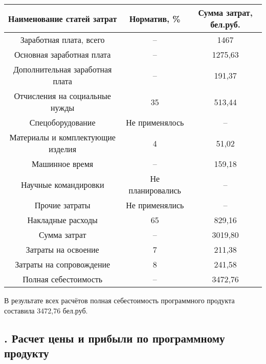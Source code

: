 {{\begin{Center}
	\begin{tabular}{|c|c|c|}
		\hline
		Наименование статей затрат & Норматив, \% & Сумма затрат, бел.руб. \\ \hline
		Заработная плата, всего & {--} & 1467 \\ \hline
		Основная заработная плата & {--} & 1275,63 \\ \hline
		Дополнительная заработная плата & {--} & 191,37 \\ \hline
		Отчисления на социальные нужды & 35 & 513,44 \\ \hline
		Спецоборудование & Не применялось & {--} \\ \hline
		Материалы и комплектующие изделия & 4 & 51,02 \\ \hline
		Машинное время & {--} & 159,18 \\ \hline
		Научные командировки & Не планировались & {--} \\ \hline
		Прочие затраты & Не применялись & {--} \\ \hline
		Накладные расходы & 65 & 829,16 \\ \hline
		Сумма затрат & {--} & 3019,80 \\ \hline
		Затраты на освоение & 7 & 211,38 \\ \hline
		Затраты на сопровождение & 8 & 241,58 \\ \hline
		Полная себестоимость & {--} & 3472,76 \\ \hline
	\end{tabular} \end{Center}} \addtocounter{tablecntr}{1} 
	\botTablespace
	
	\par \redline В результате всех расчётов полная себестоимость программного продукта составила 3472,76 бел.руб. 
}


\subtitlespace

\subsection*{ 
	\gostTitleFont
	\redline
	\thechaptercntr .\thesubchaptercntr \spc
	Расчет цены и прибыли по программному продукту
} \addtocounter{subchaptercntr}{1}

\subtitlespace

